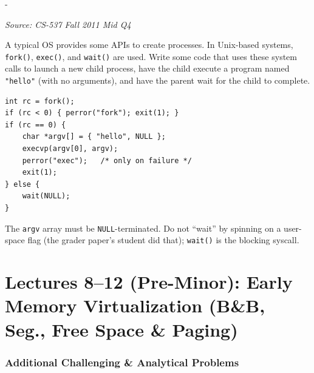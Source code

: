 \documentclass[11pt,a4paper]{article}
\makeatletter
\newcommand{\keepspace}[1]{\par\penalty-100\begingroup
  \setlength{\dimen@}{#1}\dimen@ii\pagegoal\advance\dimen@ii-\pagetotal
  \ifdim\dimen@>\dimen@ii\ifdim\dimen@ii>\z@\vfil\fi\break\fi\endgroup}
\newcounter{qn}[section]
\newenvironment{Qn}[4]{%
  \refstepcounter{qn}\keepspace{7\baselineskip}%
  \begin{tcolorbox}[qboxstyle, title={Q\thesection.\theqn\ \ [#1 \textbar\ #2]\ \ #4}]%
  {\footnotesize\color{g3}\textit{Source: #3}}\par\smallskip%
}{%
  \end{tcolorbox}%
}
\newenvironment{Sol}{%
  \begin{tcolorbox}[sboxstyle, title={Solution}]%
}{%
  \end{tcolorbox}\vspace{0.35em}%
}
\makeatother
\begin{document}
\begin{Qn}{Easy-Medium}{Lect 3}{CS-537 Fall 2011 Mid Q4}{Write \texttt{fork}/\texttt{exec}/\texttt{wait} to run \texttt{hello}}
A typical OS provides some APIs to create processes. In Unix-based systems, \texttt{fork()}, \texttt{exec()}, and \texttt{wait()} are used. Write some code that uses these system calls to launch a new child process, have the child execute a program named \texttt{"hello"} (with no arguments), and have the parent wait for the child to complete.
\end{Qn}
\begin{Sol}
\begin{lstlisting}[numbers=none]
int rc = fork();
if (rc < 0) { perror("fork"); exit(1); }
if (rc == 0) {
    char *argv[] = { "hello", NULL };
    execvp(argv[0], argv);
    perror("exec");   /* only on failure */
    exit(1);
} else {
    wait(NULL);
}
\end{lstlisting}
The \texttt{argv} array must be \texttt{NULL}-terminated. Do not ``wait'' by spinning on a user-space flag (the grader paper's student did that); \texttt{wait()} is the blocking syscall.
\end{Sol}

\clearpage

\section{Lectures 8--12 (Pre-Minor): Early Memory Virtualization (B\&B, Seg., Free Space \& Paging)}

\subsubsection*{Additional Challenging \& Analytical Problems}
\end{document}
